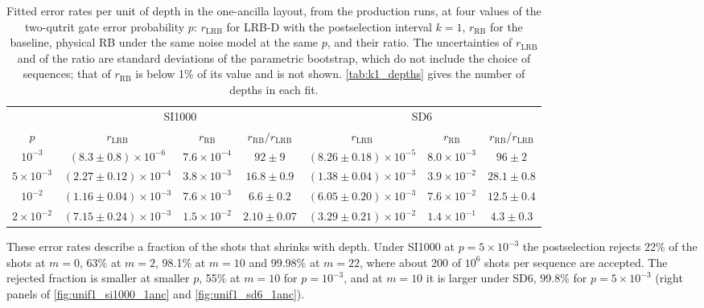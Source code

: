 \begin{table}[tp]
  \centering
  \small
  \begin{tabular}{c|ccc|ccc}
    \hline
    & \multicolumn{3}{c|}{SI1000} & \multicolumn{3}{c}{SD6} \\
    $p$ & $r_{\mathrm{LRB}}$ & $r_{\mathrm{RB}}$ & $r_{\mathrm{RB}}/r_{\mathrm{LRB}}$ & $r_{\mathrm{LRB}}$ & $r_{\mathrm{RB}}$ & $r_{\mathrm{RB}}/r_{\mathrm{LRB}}$ \\
    \hline
    $10^{-3}$ & $(8.3 \pm 0.8)\times10^{-6}$ & $7.6\times10^{-4}$ & $92 \pm 9$ & $(8.26 \pm 0.18)\times10^{-5}$ & $8.0\times10^{-3}$ & $96 \pm 2$ \\
    $5\times10^{-3}$ & $(2.27 \pm 0.12)\times10^{-4}$ & $3.8\times10^{-3}$ & $16.8 \pm 0.9$ & $(1.38 \pm 0.04)\times10^{-3}$ & $3.9\times10^{-2}$ & $28.1 \pm 0.8$ \\
    $10^{-2}$ & $(1.16 \pm 0.04)\times10^{-3}$ & $7.6\times10^{-3}$ & $6.6 \pm 0.2$ & $(6.05 \pm 0.20)\times10^{-3}$ & $7.6\times10^{-2}$ & $12.5 \pm 0.4$ \\
    $2\times10^{-2}$ & $(7.15 \pm 0.24)\times10^{-3}$ & $1.5\times10^{-2}$ & $2.10 \pm 0.07$ & $(3.29 \pm 0.21)\times10^{-2}$ & $1.4\times10^{-1}$ & $4.3 \pm 0.3$ \\
    \hline
  \end{tabular}
  \caption{Fitted error rates per unit of depth in the one-ancilla layout, from the production runs, at four values of the two-qutrit gate error probability $p$: $r_{\mathrm{LRB}}$ for LRB-D with the postselection interval $k = 1$, $r_{\mathrm{RB}}$ for the baseline, physical RB under the same noise model at the same $p$, and their ratio. The uncertainties of $r_{\mathrm{LRB}}$ and of the ratio are standard deviations of the parametric bootstrap, which do not include the choice of sequences; that of $r_{\mathrm{RB}}$ is below 1\% of its value and is not shown. \autoref{tab:k1_depths} gives the number of depths in each fit.}
  \label{tab:k1_error_rates}
\end{table}

These error rates describe a fraction of the shots that shrinks with depth. Under SI1000 at $p = 5\times10^{-3}$ the postselection rejects 22\% of the shots at $m = 0$, 63\% at $m = 2$, 98.1\% at $m = 10$ and 99.98\% at $m = 22$, where about 200 of $10^6$ shots per sequence are accepted. The rejected fraction is smaller at smaller $p$, 55\% at $m = 10$ for $p = 10^{-3}$, and at $m = 10$ it is larger under SD6, 99.8\% for $p = 5\times10^{-3}$ (right panels of \autoref{fig:unif1_si1000_1anc} and \autoref{fig:unif1_sd6_1anc}).

